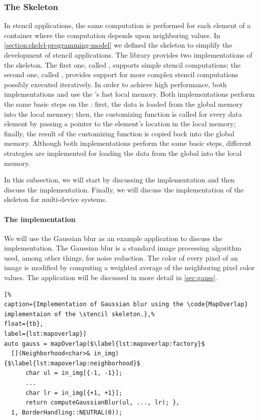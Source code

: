 \subsubsection{The \stencil Skeleton}
\label{sec:skelcl:stencil}
In stencil applications, the same computation is performed for each element of a container where the computation depends upon neighboring values.
In \autoref{section:skelcl-programming-model} we defined the \stencil skeleton to simplify the development of stencil applications.
The \SkelCL library provides two implementations of the \stencil skeleton.
The first one, called , supports simple stencil computations;
the second one, called , provides support for more complex stencil computations possibly executed iteratively.
In order to achieve high performance, both implementations  and  use the \GPU's fast local memory.
Both implementations perform the same basic steps on the \GPU:
first, the data is loaded from the global memory into the local memory;
then, the customizing function is called for every data element by passing a pointer to the element's location in the local memory;
finally, the result of the customizing function is copied back into the global memory.
Although both implementations perform the same basic steps, different strategies are implemented for loading the data from the global into the local memory.

In this subsection, we will start by discussing the  implementation and then discuss the  implementation.
Finally, we will discuss the implementation of the \stencil skeleton for multi-device systems.

\paragraph{The  implementation}

We will use the Gaussian blur as an example application to discuss the  implementation.
The Gaussian blur is a standard image processing algorithm used, among other things, for noise reduction.
The color of every pixel of an image is modified by computing a weighted average of the neighboring pixel color values.
The application will be discussed in more detail in \autoref{sec:gauss}.

\begin{lstlisting}[%
caption={Implementation of Gaussian blur using the \code{MapOverlap} implementaion of the \stencil skeleton.},%
float={tb},
label={lst:mapoverlap}]
auto gauss = mapOverlap($\label{lst:mapoverlap:factory}$
  [](Neighborhood<char>& in_img) {$\label{lst:mapoverlap:neighborhood}$
      char ul = in_img[{-1, -1}];
      ...
      char lr = in_img[{+1, +1}];
      return computeGaussianBlur(ul, ..., lr); },
  1, BorderHandling::NEUTRAL(0));
\end{lstlisting}

